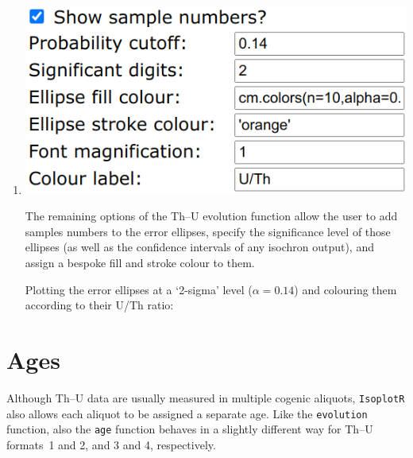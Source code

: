 \begin{refsection}
\begin{enumerate}
\item\begin{minipage}[t]{.45\linewidth}
    \strut\vspace*{-\baselineskip}\newline
    \includegraphics[width=\linewidth]{../figures/ThUevolutionOtherOptions.png}
  \end{minipage}
  \begin{minipage}[t]{.55\linewidth}
    The remaining options of the Th--U evolution function allow the
    user to add samples numbers to the error ellipses, specify the
    significance level of those ellipses (as well as the confidence
    intervals of any isochron output), and assign a bespoke fill and
    stroke colour to them.
  \end{minipage}

  Plotting the error ellipses at a `2-sigma' level ($\alpha=0.14$) and
  colouring them according to their U/Th ratio:


\end{enumerate}

\section{Ages}\label{sec:ThU-ages-R}

Although Th--U data are usually measured in multiple cogenic aliquots,
\texttt{IsoplotR} also allows each aliquot to be assigned a separate
age. Like the \texttt{evolution} function, also the \texttt{age}
function behaves in a slightly different way for Th--U formats~1 and
2, and 3 and 4, respectively.


\end{refsection}

